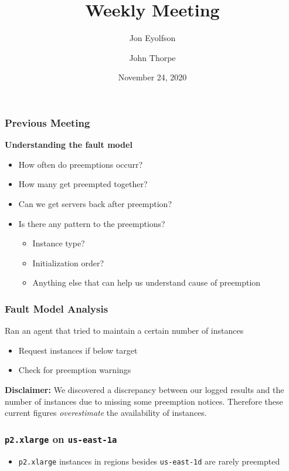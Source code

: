 
\title{Weekly Meeting}
\date{November 24, 2020}
\author{Jon Eyolfson \and John Thorpe}



  \begin{frame}[plain]
    \titlepage
  \end{frame}

  \setcounter{framenumber}{0}

  \begin{frame}
    \frametitle{Previous Meeting}
    \textbf{Understanding the fault model}
      \begin{itemize}
        \item How often do preemptions occurr?
        \item How many get preempted together?
        \item Can we get servers back after preemption?
        \item Is there any pattern to the preemptions?
        \begin{itemize}
          \item Instance type?
          \item Initialization order?
          \item Anything else that can help us understand cause of preemption
        \end{itemize}

      \end{itemize}
  \end{frame}

  \begin{frame}
    \frametitle{Fault Model Analysis}

    Ran an agent that tried to maintain a certain number of instances \\
    \begin{itemize}
      \item Request instances if below target
      \item Check for preemption warnings
    \end{itemize}

    \vspace{3em}
    \textbf{Disclaimer:} We discovered a discrepancy between our logged results
      and the number of instances due to missing some preemption notices.
      Therefore these current figures \emph{overestimate} the availability of
      instances.
  \end{frame}

  \begin{frame}
    \frametitle{\texttt{p2.xlarge} on \texttt{us-east-1a}}
    \begin{center}
      
    \end{center}
    \begin{itemize}
      \item \texttt{p2.xlarge} instances in regions besides \texttt{us-east-1d} are rarely preempted
    \end{itemize}

  \end{frame}


